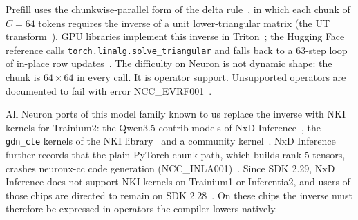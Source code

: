\documentclass[11pt]{article}
\theoremstyle{remark}
\begin{document}
Prefill uses the chunkwise-parallel form of the delta rule~\cite{yang2024deltanet}, in which each chunk of $C=64$ tokens
requires the inverse of a unit lower-triangular matrix (the UT transform~\cite{joffrain2006ut}). GPU libraries implement this
inverse in Triton~\cite{fla}; the Hugging Face reference calls \texttt{torch.linalg.solve\_triangular} and falls back to a
63-step loop of in-place row updates~\cite{hftransformers}. The difficulty on Neuron is not dynamic shape: the chunk is
$64\times64$ in every call. It is operator support. Unsupported operators are documented to fail with error
NCC\_EVRF001~\cite{neuronevrf001}.

All Neuron ports of this model family known to us replace the inverse with NKI kernels for Trainium2: the Qwen3.5 contrib
models of NxD Inference~\cite{nxdicontrib}, the \texttt{gdn\_cte} kernels of the NKI library~\cite{nkilibgdn} and a community
kernel~\cite{jburtoft}. NxD Inference further records that the plain PyTorch chunk path, which builds rank-5 tensors, crashes
neuronx-cc code generation (NCC\_INLA001)~\cite{nxdicontrib}. Since SDK 2.29, NxD Inference does not support NKI kernels on
Trainium1 or Inferentia2, and users of those chips are directed to remain on SDK 2.28~\cite{neuron229}. On these chips the
inverse must therefore be expressed in operators the compiler lowers natively.
\end{document}
